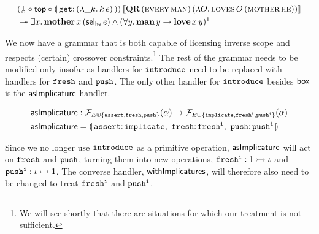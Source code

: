 \begin{align*}
  &\ap{(\cherry \circ \TOP \circ \banana{\onto{\op{get}}{(\lam{\_ k}{\ap{k}{e}})}})}{\sem{\app{\abs{QR}}{(\ap{\abs{every}}{\abs{man}})}{(\lam{O}{\app{\abs{loves}}{O}{(\ap{\abs{mother}}{\abs{he}})}})}}} \\
  &\tto \exists x.\, \app{\obj{mother}}{x}{(\ap{\selhe}{e})} \land (\forall y.\, \ap{\obj{man}}{y} \to \app{\obj{love}}{x}{y})\footnotemark
\end{align*}

We now have a grammar that is both capable of licensing inverse scope and
respects (certain) crossover constraints.\footnote{We will see shortly that
  there are situations for which our treatment is not sufficient.} The rest
of the grammar needs to be modified only insofar as handlers for
$\mathtt{introduce}$ need to be replaced with handlers for $\mathtt{fresh}$ and
$\mathtt{push}$. The only other handler for $\mathtt{introduce}$ besides $\textsf{box}$ is
the $\textsf{asImplicature}$ handler.

\begin{align*}
  \asImplicature &: \FF_{E \uplus \{\op{assert},\op{fresh},\op{push}\}}(\alpha) \to
                    \FF_{E \uplus \{\op{implicate},\op{fresh^i},\op{push^i}\}}(\alpha) \\
  \asImplicature &= \banana{\onto{\op{assert}}{\op{implicate}},\
                            \onto{\op{fresh}}{\op{fresh^i}},\
                            \onto{\op{push}}{\op{push^i}}}
\end{align*}

Since we no longer use $\mathtt{introduce}$ as a primitive operation,
$\textsf{asImplicature}$ will act on $\mathtt{fresh}$ and $\mathtt{push}$, turning them
into new operations, $\mathtt{fresh^i} : 1 \rightarrowtail \iota$ and
$\mathtt{push^i} : \iota \rightarrowtail 1$. The converse handler, $\textsf{withImplicatures}$,
will therefore also need to be changed to treat $\mathtt{fresh^i}$ and
$\mathtt{push^i}$.

